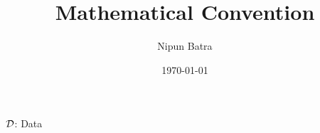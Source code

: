 \documentclass{beamer}
\title{Mathematical Convention}
\date{\today}
\author{Nipun Batra}
\institute{IIT Gandhinagar}
\begin{document}
  \maketitle
  
  
  
\begin{frame}
$\mathcal{D}$: Data
\begin{enumerate}
\end{enumerate}
\end{frame}
\end{document}
